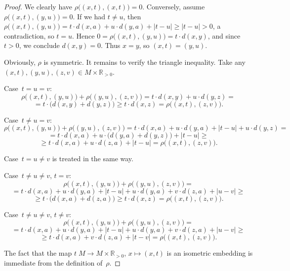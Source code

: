 \documentclass[10pt,a4paper]{amsart}
\newcommand{\RR}{\mathbb{R}}
\begin{document}
\begin{proof}
We clearly have $\rho\big((x, t), (x, t)\big) = 0$. Conversely, assume $\rho\big((x, t), (y, u)\big) = 0$. If we had $t \neq u$, then $\rho\big((x, t), (y, u)\big) = t \cdot d(x, a) + u \cdot d(y, a) + |t - u| \geq |t - u| > 0$, a contradiction, so $t = u$. Hence $0 = \rho\big((x, t), (y, u)\big) = t \cdot d(x, y)$, and since $t > 0$, we conclude $d(x, y) = 0$. Thus $x = y$, so $(x, t) = (y, u)$.

Obviously, $\rho$ is symmetric. It remains to verify the triangle inequality. Take any $(x, t), (y, u), (z, v) \in M \times \RR_{> 0}$.

Case~$t = u = v$:
\[\rho\big((x, t), (y, u)\big) + \rho\big((y, u), (z, v)\big) = t \cdot d(x, y) + u \cdot d(y, z) =\]
\[= t \cdot \big(d(x, y) + d(y, z)\big) \geq t \cdot d(x, z) = \rho\big((x, t), (z, v)\big).\]

Case~$t \neq u = v$:
\[\rho\big((x, t), (y, u)\big) + \rho\big((y, u), (z, v)\big) = t \cdot d(x, a) + u \cdot d(y, a) + |t - u| + u \cdot d(y, z) =\]
\[= t \cdot d(x, a) + u \cdot \big(d(y, a) + d(y, z)\big) + |t - u| \geq\]
\[\geq t \cdot d(x, a) + u \cdot d(z, a) + |t - u| = \rho\big((x, t), (z, v)\big).\]

Case~$t = u \neq v$ is treated in the same way.

Case~$t \neq u \neq v$, $t = v$:
\[\rho\big((x, t), (y, u)\big) + \rho\big((y, u), (z, v)\big) =\]
\[= t \cdot d(x, a) + u \cdot d(y, a) + |t - u| + u \cdot d(y, a) + v \cdot d(z, a) + |u - v| \geq\]
\[\geq t \cdot \big(d(x, a) + d(z, a)\big) \geq t \cdot d(x, z) = \rho\big((x, t), (z, v)\big).\]

Case~$t \neq u \neq v$, $t \neq v$:
\[\rho\big((x, t), (y, u)\big) + \rho\big((y, u), (z, v)\big) =\]
\[= t \cdot d(x, a) + u \cdot d(y, a) + |t - u| + u \cdot d(y, a) + v \cdot d(z, a) + |u - v| \geq\]
\[\geq t \cdot d(x, a) + v \cdot d(z, a) + |t - v| = \rho\big((x, t), (z, v)\big).\]

The fact that the map $t\;\!M \to M \times \RR_{> 0}$, $x \mapsto (x, t)$ is an isometric embedding is immediate from the definition of~$\rho$.
\end{proof}
\end{document}
